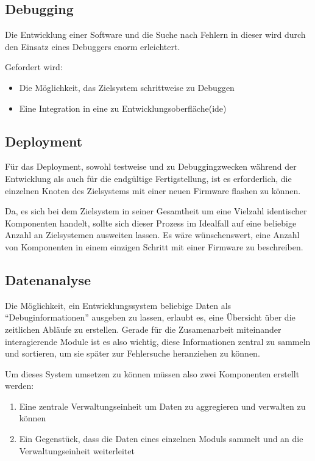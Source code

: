 \subsection{Debugging} Die Entwicklung einer Software und die Suche nach Fehlern
in dieser wird durch den Einsatz eines Debuggers enorm erleichtert. 

Gefordert wird:
\begin{itemize}
  \item Die Möglichkeit, das Zielsystem schrittweise zu Debuggen
  \item Eine Integration in eine zu Entwicklungsoberfläche(\gls{ide})
\end{itemize}

\subsection{Deployment} Für das Deployment, sowohl testweise und zu
Debuggingzwecken während der Entwicklung als auch für die endgültige
Fertigstellung, ist es erforderlich, die einzelnen Knoten des Zielsystems mit
einer neuen Firmware flashen zu können.

Da, es sich bei dem Zielsystem in seiner Gesamtheit um eine Vielzahl identischer
Komponenten handelt, sollte sich dieser Prozess im Idealfall auf
eine beliebige Anzahl an Zielsystemen ausweiten lassen. Es wäre wünschenswert,
eine Anzahl von Komponenten in einem einzigen Schritt mit einer Firmware zu
beschreiben.

\subsection{Datenanalyse} Die Möglichkeit, ein Entwicklungssystem beliebige
Daten als "`Debuginformationen"' ausgeben zu lassen, erlaubt es, eine
Übersicht über die zeitlichen Abläufe zu erstellen. Gerade für die
Zusamenarbeit miteinander interagierende Module ist es also wichtig, diese
Informationen zentral zu sammeln und sortieren, um sie später zur
Fehlersuche heranziehen zu können.

Um dieses System umsetzen zu können müssen also zwei Komponenten erstellt
werden:
\begin{enumerate}
  \item Eine zentrale Verwaltungseinheit um Daten zu aggregieren und verwalten
  zu können
  \item Ein Gegenstück, dass die Daten eines einzelnen Moduls sammelt und an die
  Verwaltungseinheit weiterleitet
\end{enumerate}


